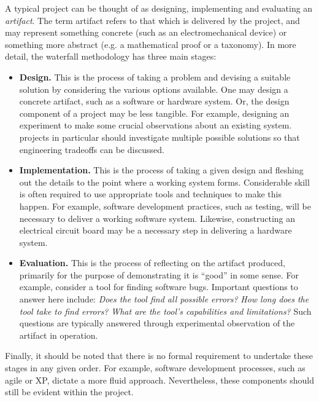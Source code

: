 A typical project can be thought of as designing,
implementing and evaluating an {\em artifact}.  The term artifact
refers to that which is delivered by the project, and may represent
something concrete (such as an electromechanical device) or
something more abstract (e.g. a mathematical proof or a taxonomy).  
In more detail, the waterfall methodology has
three main stages:
\begin{itemize}
\item{\bf Design.}  This is the process of taking a problem and
  devising a suitable solution by considering the various options
  available.  One may design a concrete artifact, such as a software
  or hardware system.  Or, the design component of a project may be
  less tangible.  For example, designing an experiment to make some
  crucial observations about an existing system. \engr projects in particular
  should investigate multiple possible solutions so that engineering
  tradeoffs can be discussed.
\item{\bf Implementation.}  This is the process of taking a given
  design and fleshing out the details to the point where a working
  system forms.  Considerable skill is often required to use
  appropriate tools and techniques to make this happen.  For example,
  software development practices, such as testing, will be necessary
  to deliver a working software system.  Likewise, constructing an
  electrical circuit board may be a necessary step in delivering a
  hardware system.
\item{\bf Evaluation.}  This is the process of reflecting on the
  artifact produced, primarily for the purpose of demonstrating it is
  ``good'' in some sense.  For example, consider a tool for finding
  software bugs.  Important questions to answer here include: {\em
    Does the tool find all possible errors?} {\em How long does the
    tool take to find errors?} {\em What are the tool's capabilities and limitations?}  
Such questions are typically answered
  through experimental observation of the artifact in operation.
\end{itemize}
Finally, it should be noted that there is no formal requirement to
undertake these stages in any given order.  For example, software
development processes, such as agile or XP, dictate a more fluid
approach.  Nevertheless, these components should still be evident
within the project.

\pagebreak
